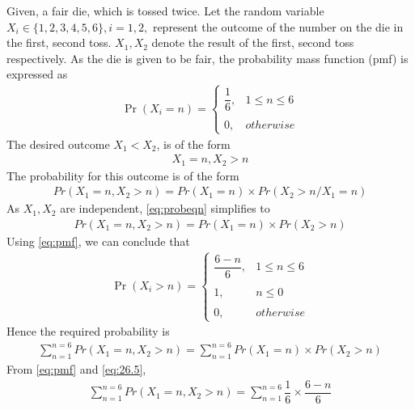 \documentclass[journal,12pt,twocolumn]{IEEEtran}
\begin{document}
Given, a fair die, which is tossed twice. Let the random variable $X_{i}\in\{1,2,3,4,5,6\},i=1,2,$ represent the outcome of the number on the die in the first, second toss. $X_{1},X_{2}$ denote the result of the first, second toss respectively.
\newline
\newline
As the die is given to be fair, the probability  mass function (pmf) is expressed as \begin{align}
    \tag{26.1}
    \Pr(X_{i}=n) = 
	\begin{cases}
	\dfrac{1}{6}, & 1\leq n\leq6 \\~\\[-1em]
	0, & otherwise
	\end{cases}
	\label{eq:pmf}
\end{align}
\newline
The desired outcome $X_{1}<X_{2}$, is of the form
\begin{align}
    \tag{26.2}
    X_{1}=n,X_{2}>n
\end{align}
The probability for this outcome is of the form
\begin{align}
    \tag{26.3}
    Pr(X_{1}=n,X_{2}>n)=Pr(X_{1}=n) \times Pr(X_{2}>n/X_{1}=n)
    \label{eq:probeqn}
\end{align}
As $X_{1},X_{2}$ are independent, \eqref{eq:probeqn} simplifies to
\begin{align}
    \tag{26.4}
    Pr(X_{1}=n,X_{2}>n)=Pr(X_{1}=n) \times Pr(X_{2}>n)
\end{align}
Using \eqref{eq:pmf}, we can conclude that
\begin{align}
    \tag{26.5}
    \Pr(X_{i}>n) = 
	\begin{cases}
	\dfrac{6-n}{6}, & 1\leq n\leq6 \\~\\[-1em]
	1, & n \leq 0 \\~\\[-1em]
	0, & otherwise
	\end{cases}
	\label{eq:26.5}
\end{align}
\newline
Hence the required probability is
\begin{align}
    \tag{26.6}
    \sum_{n=1}^{n=6}Pr(X_{1}=n,X_{2}>n)=\sum_{n=1}^{n=6}Pr(X_{1}=n) \times Pr(X_{2}>n)
\end{align}
From \eqref{eq:pmf} and \eqref{eq:26.5},
\begin{align}
    \tag{26.7}
    \sum_{n=1}^{n=6}Pr(X_{1}=n,X_{2}>n)=\sum_{n=1}^{n=6}\dfrac{1}{6} \times \dfrac{6-n}{6}
    \label{eq:finalexpsn}
\end{align}
\end{document}
